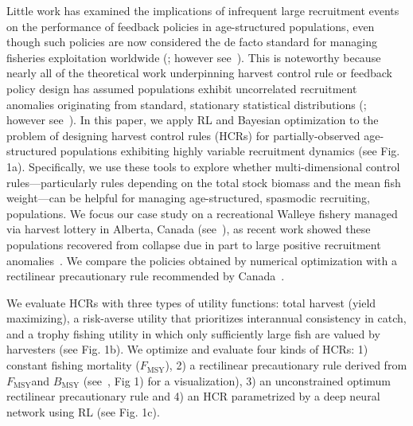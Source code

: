 \documentclass[floatfix,nofootinbib,longbibliography,notitlepage]{revtex4-1}
\def\textfmsy{$F_{\text{MSY}}$}
\def\bmsy{B_{\text{MSY}}}
\begin{document}
Little work has examined the implications of infrequent large recruitment events on the performance of feedback policies in age-structured populations, even though such policies are now considered the de facto standard for managing fisheries exploitation worldwide (\cite{silvar-viladomiu,free-etal-2023}; however see~\cite{licandeo-etal-2020}).
This is noteworthy because nearly all of the theoretical work underpinning harvest control rule or feedback policy design has assumed populations exhibit uncorrelated recruitment anomalies originating from standard, stationary statistical distributions (\cite{walters1975optimal,walters-hilborn-1978,reed1979optimal}; however see~\cite{parma1990experimental,hawkshaw2015harvest}). 
In this paper, we apply RL and Bayesian optimization to the problem of designing harvest control rules (HCRs) for partially-observed age-structured populations exhibiting highly variable recruitment dynamics (see Fig. 1a).  
Specifically, we use these tools to explore whether multi-dimensional control rules—particularly rules depending on the total stock biomass and the mean fish weight—can be helpful for managing age-structured, spasmodic recruiting, populations. 
We focus our case study on a recreational Walleye fishery managed via harvest lottery in Alberta, Canada (see~\cite{sullivan2003}), as recent work showed these populations recovered from collapse due in part to large positive recruitment anomalies~\cite{post-etal-2002,cahill2022}. 
We compare the policies obtained by numerical optimization with a rectilinear precautionary rule recommended by Canada~\cite{dfo2006}.  

We evaluate HCRs with three types of utility functions: total harvest (yield maximizing), a risk-averse utility that prioritizes interannual consistency in catch, and a trophy fishing utility in which only sufficiently large fish are valued by harvesters (see Fig. 1b). 
We optimize and evaluate four kinds of HCRs: 1) constant fishing mortality (\textfmsy), 2) a rectilinear precautionary rule derived from \textfmsy and $\bmsy$ (see~\cite{dfo2006}, Fig 1) for a visualization), 3) an unconstrained optimum rectilinear precautionary rule and 4) an HCR parametrized by a deep neural network using RL (see Fig. 1c).
\end{document}
